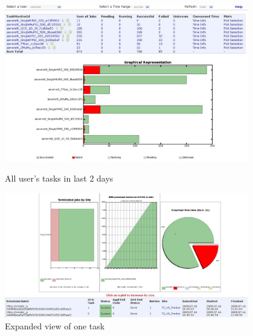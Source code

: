 \begin{figure}
\begin{minipage}{.45\textwidth}
\centering
 \includegraphics[width=0.95\textwidth]{TaskMonitor1.eps}
\caption{All user's tasks in last 2 days}
\label{fig:TaskMonitor1}
\end{minipage}
\begin{minipage}{.45\textwidth}
\centering
\includegraphics[width=0.95\textwidth]{TaskMonitor2.eps}
\caption{Expanded view of one task}
\label{fig:TaskMonitor2}
\end{minipage}
\end{figure}

